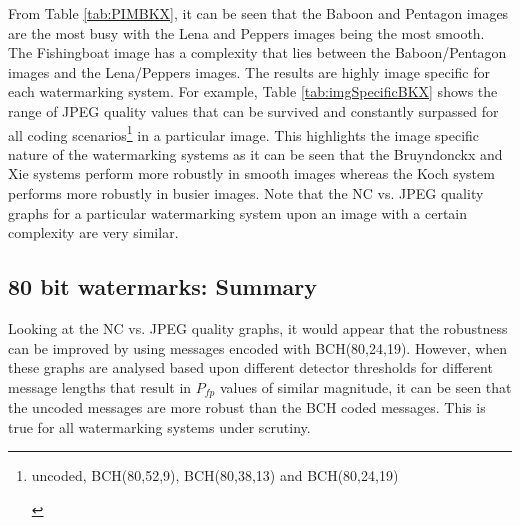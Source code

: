 \documentclass[12pt]{report}
\begin{document}
From Table \ref{tab:PIMBKX},
it can be seen that the Baboon and Pentagon images are the most busy with the Lena and Peppers images being the most smooth. The
Fishingboat image has a complexity that lies between the Baboon/Pentagon images and the Lena/Peppers images.
The results are highly image specific for each watermarking system. For example, Table \ref{tab:imgSpecificBKX}
shows the range of JPEG quality values that can be survived and constantly surpassed for all coding 
scenarios\footnote{\begin{scriptsize}uncoded, BCH(80,52,9), BCH(80,38,13) and BCH(80,24,19)\end{scriptsize}}
in a particular image. This highlights the image specific nature of the
watermarking systems as it can be seen that the Bruyndonckx and Xie systems perform more robustly in smooth images
whereas the Koch system performs more robustly in busier images. 
Note that the NC vs. JPEG quality graphs for a particular watermarking system upon an image with a certain complexity
are very similar.


\subsection{80 bit watermarks: Summary}
Looking at the NC vs. JPEG quality graphs, it would appear that the robustness can be improved by using messages encoded
with BCH(80,24,19). However, when these graphs are analysed based upon different detector thresholds for different message lengths that
result in $P_{fp}$ values of similar magnitude, it can be seen that the uncoded messages are more robust than the BCH coded messages. 
This is true for all watermarking systems under scrutiny.
\end{document}
